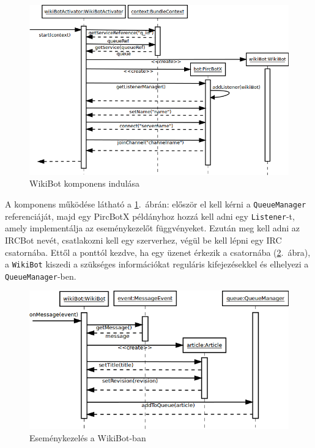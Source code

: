 \begin{figure}[htp]
\centering
\includegraphics[scale=0.5]{img/sequence_wikiBot}
\caption{WikiBot komponens indulása}
\label{fig:sequence_wikiBot}
\end{figure}

A komponens működése látható a \ref{fig:sequence_wikiBot}.~ábrán: először el kell kérni a \texttt{QueueManager} referenciáját, majd egy PircBotX példányhoz hozzá kell adni egy \texttt{Listener}-t, amely implementálja az eseménykezelőt függvényeket. Ezután meg kell adni az IRCBot nevét, csatlakozni kell egy szerverhez, végül be kell lépni egy IRC csatornába. Ettől a ponttól kezdve, ha egy üzenet érkezik a csatornába (\ref{fig:sequence_wikiBot2}.~ábra), a \texttt{WikiBot} kiszedi a szükséges információkat reguláris kifejezésekkel és elhelyezi a \texttt{QueueManager}-ben.

\begin{figure}[htp]
\centering
\includegraphics[scale=0.5]{img/sequence_wikiBot2}
\caption{Eseménykezelés a WikiBot-ban}
\label{fig:sequence_wikiBot2}
\end{figure}

